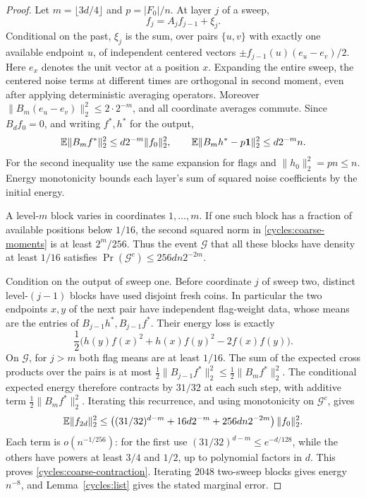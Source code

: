 \begin{proof}
Let $m=\lfloor3d/4\rfloor$ and $p=|F_0|/n$. At layer $j$ of a sweep,
\[
 f_j=A_jf_{j-1}+\xi_j.
\]
Conditional on the past, $\xi_j$ is the sum, over pairs
$\{u,v\}$ with exactly one available endpoint $u$, of independent centered vectors
$\pm f_{j-1}(u)(e_u-e_v)/2$. Here $e_x$ denotes the unit vector at a
position $x$. Expanding the entire sweep, the centered noise terms at
different times are orthogonal in second moment, even after applying
deterministic averaging operators. Moreover
$\|B_m(e_u-e_v)\|_2^2\le2\cdot2^{-m}$, and all coordinate averages
commute. Since $B_df_0=0$, and writing $f^*,h^*$ for the output,
\begin{equation}\label{cycles:coarse-moments}
 \mathbb E\|B_mf^*\|_2^2\le d2^{-m}\|f_0\|_2^2,\qquad
 \mathbb E\|B_mh^*-p\mathbf 1\|_2^2\le d2^{-m}n.
\end{equation}
For the second inequality use the same expansion for flags and
$\|h_0\|_2^2=pn\le n$. Energy monotonicity bounds each layer's sum of
squared noise coefficients by the initial energy.

A level-$m$ block varies in coordinates $1,\ldots,m$. If one such block
has a fraction of available positions below $1/16$, the second squared norm in
\eqref{cycles:coarse-moments} is at least $2^m/256$.
Thus the event $\mathcal G$ that all these blocks have density at least
$1/16$ satisfies
$\Pr(\mathcal G^c)\le256dn2^{-2m}$.

Condition on the output of sweep one. Before coordinate $j$ of sweep
two, distinct level-$(j-1)$ blocks have used disjoint fresh coins.
In particular the two endpoints $x,y$ of the next pair have independent
flag-weight data, whose means are the entries of
$B_{j-1}h^*,B_{j-1}f^*$. Their energy loss is exactly
\[
 \frac12\bigl(h(y)f(x)^2+h(x)f(y)^2-2f(x)f(y)\bigr).
\]
On $\mathcal G$, for $j>m$ both flag means are at least $1/16$.
The sum of the expected cross products over the pairs is at most
$\frac12\|B_{j-1}f^*\|_2^2\le\frac12\|B_mf^*\|_2^2$.
The conditional expected energy therefore contracts by $31/32$ at each
such step, with additive term $\frac12\|B_mf^*\|_2^2$.
Iterating this recurrence, and using monotonicity on $\mathcal G^c$,
gives
\begin{equation}\label{cycles:coarse-factor}
 \mathbb E\|f_{2d}\|_2^2\le
 \left((31/32)^{d-m}+16d2^{-m}+256dn2^{-2m}\right)\|f_0\|_2^2.
\end{equation}
Each term is $o(n^{-1/256})$: for the first use
$(31/32)^{d-m}\le e^{-d/128}$, while the others have powers at least
$3/4$ and $1/2$, up to polynomial factors in $d$.
This proves \eqref{cycles:coarse-contraction}. Iterating $2048$
two-sweep blocks gives energy $n^{-8}$, and Lemma~\ref{cycles:list}
gives the stated marginal error.
\end{proof}

